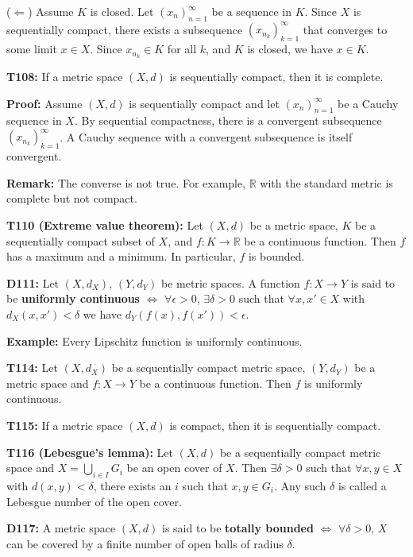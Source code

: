 \documentclass[twocolumn,10pt]{article}
\begin{document}
($\Leftarrow$) Assume $K$ is closed. Let $(x_n)_{n=1}^{\infty}$ be a sequence in $K$. Since $X$ is sequentially compact, there exists a subsequence $(x_{n_k})_{k=1}^{\infty}$ that converges to some limit $x\in X$. Since $x_{n_k}\in K$ for all $k$, and $K$ is closed, we have $x\in K$.
\color{black}

\textbf{T108:} If a metric space $(X,d)$ is sequentially compact, then it is complete.

\color{red}
\textbf{Proof:} Assume $(X,d)$ is sequentially compact and let $(x_n)_{n=1}^{\infty}$ be a Cauchy sequence in $X$. By sequential compactness, there is a convergent subsequence $(x_{n_k})_{k=1}^{\infty}$. A Cauchy sequence with a convergent subsequence is itself convergent.
\color{black}

\textbf{Remark:} The converse is not true. For example, $\mathbb{R}$ with the standard metric is complete but not compact.

\textbf{T110 (Extreme value theorem):} Let $(X,d)$ be a metric space, $K$ be a sequentially compact subset of $X$, and $f:K\to\mathbb{R}$ be a continuous function. Then $f$ has a maximum and a minimum. In particular, $f$ is bounded.

\textbf{D111:} Let $(X,d_X)$, $(Y,d_Y)$ be metric spaces. A function $f:X\to Y$ is said to be \textbf{uniformly continuous} $\Leftrightarrow$ $\forall\epsilon>0$, $\exists\delta>0$ such that $\forall x,x'\in X$ with $d_X(x,x')<\delta$ we have $d_Y(f(x),f(x'))<\epsilon$.

\color{red}
\textbf{Example:} Every Lipschitz function is uniformly continuous.
\color{black}

\textbf{T114:} Let $(X,d_X)$ be a sequentially compact metric space, $(Y,d_Y)$ be a metric space and $f:X\to Y$ be a continuous function. Then $f$ is uniformly continuous.

\textbf{T115:} If a metric space $(X,d)$ is compact, then it is sequentially compact.

\textbf{T116 (Lebesgue's lemma):} Let $(X,d)$ be a sequentially compact metric space and $X=\bigcup_{i\in I}G_i$ be an open cover of $X$. Then $\exists\delta>0$ such that $\forall x,y\in X$ with $d(x,y)<\delta$, there exists an $i$ such that $x,y\in G_i$. Any such $\delta$ is called a Lebesgue number of the open cover.

\textbf{D117:} A metric space $(X,d)$ is said to be \textbf{totally bounded} $\Leftrightarrow$ $\forall\delta>0$, $X$ can be covered by a finite number of open balls of radius $\delta$.
\end{document}
